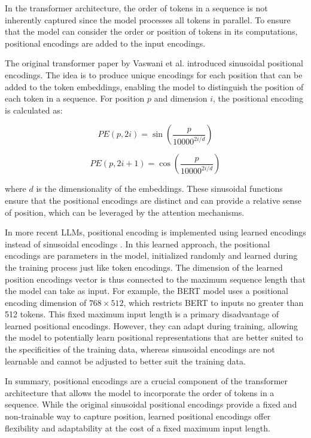 In the transformer architecture, the order of tokens in a sequence is not inherently captured since the model processes all tokens in parallel. To ensure that the model can consider the order or position of tokens in its computations, positional encodings are added to the input encodings.

The original transformer paper by Vaswani et al. \cite{vaswani2017attention} introduced sinusoidal positional encodings. The idea is to produce unique encodings for each position that can be added to the token embeddings, enabling the model to distinguish the position of each token in a sequence. For position \( p \) and dimension \( i \), the positional encoding is calculated as:

\begin{equation}
    PE(p, 2i) = \sin\left(\frac{p}{10000^{2i/d}}\right)
\end{equation}

\begin{equation}
    PE(p, 2i + 1) = \cos\left(\frac{p}{10000^{2i/d}}\right)
\end{equation}

where \( d \) is the dimensionality of the embeddings. These sinusoidal functions ensure that the positional encodings are distinct and can provide a relative sense of position, which can be leveraged by the attention mechanisms.

In more recent LLMs, positional encoding is implemented using learned encodings instead of sinusoidal encodings \cite{jin2023growlength}. In this learned approach, the positional encodings are parameters in the model, initialized randomly and learned during the training process just like token encodings. The dimension of the learned position encodings vector is thus connected to the maximum sequence length that the model can take as input. For example, the BERT \cite{devlin2018bert} model uses a positional encoding dimension of \( 768 \times 512 \), which restricts BERT to inputs no greater than 512 tokens. This fixed maximum input length is a primary disadvantage of learned positional encodings. However, they can adapt during training, allowing the model to potentially learn positional representations that are better suited to the specificities of the training data, whereas sinusoidal encodings are not learnable and cannot be adjusted to better suit the training data.

In summary, positional encodings are a crucial component of the transformer architecture that allows the model to incorporate the order of tokens in a sequence. While the original sinusoidal positional encodings provide a fixed and non-trainable way to capture position, learned positional encodings offer flexibility and adaptability at the cost of a fixed maximum input length.

